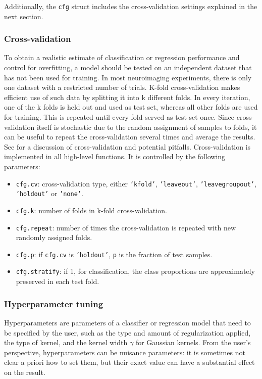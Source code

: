 \documentclass[utf8]{frontiersSCNS} %
\newcommand{\ttt}[1]{\texttt{#1}}
\begin{document}
Additionally, the \ttt{cfg} struct includes the cross-validation settings explained in the next section.


\subsubsection{Cross-validation}

To obtain a realistic estimate of classification or regression performance and control for overfitting, a model should be tested on an independent dataset that has not been used for training. In most neuroimaging experiments, there is only one dataset with a restricted number of trials. K-fold cross-validation makes efficient use of such data by splitting it into k different folds. In every iteration, one of the k folds is held out and used as test set, whereas all other folds are used for training. This is repeated until every fold served as test set once. Since cross-validation itself is stochastic due to the random assignment of samples to folds, it can be useful to repeat the cross-validation several times and average the results. See \cite{Lemm2011,Varoquaux2017} for a discussion of cross-validation and potential pitfalls. Cross-validation is implemented in all high-level functions. It is controlled by the following parameters:

\begin{itemize}
    \item \ttt{cfg.cv}: cross-validation type, either \ttt{'kfold'}, \ttt{'leaveout'}, \ttt{'leavegroupout'}, \ttt{'holdout'} or \ttt{'none'}.
    \item \ttt{cfg.k}: number of folds in k-fold cross-validation.
    \item \ttt{cfg.repeat}: number of times the cross-validation is repeated with new randomly assigned folds.
    \item \ttt{cfg.p}: if \ttt{cfg.cv} is \ttt{'holdout'}, \ttt{p} is the fraction of test samples.
    \item \ttt{cfg.stratify}: if 1, for classification, the class proportions are approximately preserved in each test fold.
\end{itemize}

\subsubsection{Hyperparameter tuning}

Hyperparameters are parameters of a classifier or regression model that need to be specified by the user, such as the type and amount of regularization applied, the type of kernel, and the kernel width $\gamma$ for Gaussian kernels. From the user's perspective, hyperparameters can be nuisance parameters: it is sometimes not clear a priori how to set them, but their exact value can have a substantial effect on the result.
\end{document}
